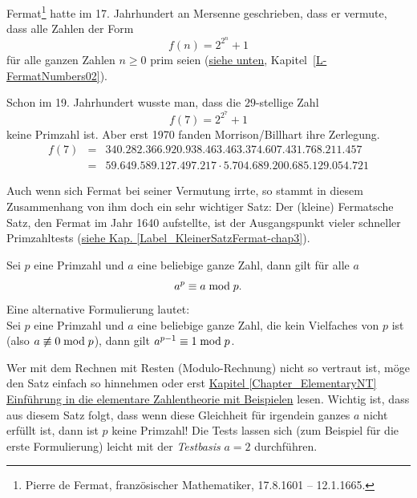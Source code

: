 \begin{refsegment}
\hypertarget{FermatNumbers01}{}\label{FermatNumbers01}%
Fermat\footnote{%
Pierre de Fermat, französischer Mathematiker, 17.8.1601 -- 12.1.1665.
}
 hatte im 17. Jahrhundert an Mersenne
 geschrieben, dass er vermute,
dass alle Zahlen der Form $$ f(n) = 2^{2^n} + 1 $$
für alle ganzen Zahlen $ n \geq 0 $ prim seien
(\hyperlink{FermatNumbers02}{siehe unten}, Kapitel~\ref{L-FermatNumbers02}).

Schon im 19. Jahrhundert wusste man, dass die $29$-stellige Zahl
$$ f(7) = 2^{2^7} + 1 $$
keine Primzahl ist. Aber erst 1970 fanden Morrison/Billhart ihre Zerlegung.
\label{F7Morrison}
\begin{eqnarray*}
f(7) & = & 340.282.366.920.938.463.463.374.607.431.768.211.457 \\
& = & 59. 649. 589. 127. 497. 217 \cdot  5.704.689.200.685.129.054.721
\end{eqnarray*}

Auch wenn sich Fermat bei seiner Vermutung irrte, so stammt in diesem
Zusammenhang von ihm doch ein sehr wichtiger Satz: Der (kleine)
Fermatsche Satz, den Fermat im Jahr 1640 aufstellte, ist der
Ausgangspunkt vieler schneller Primzahltests
(\hyperlink{KleinerSatzFermat-chap3}{siehe Kap.
\ref{Label_KleinerSatzFermat-chap3}}).

\hypertarget{KleinerSatzFermat-chap2}{}
\begin{satz}\label{thm-pz-fermat1}
Sei $p$ eine Primzahl und $a$ eine beliebige ganze Zahl, dann gilt für
alle $a$ $$a^p \equiv a \; {\rm mod} \; p.$$
Eine alternative Formulierung lautet: \\
Sei $p$ eine Primzahl und $a$ eine beliebige ganze Zahl, die kein
Vielfaches von $p$ ist (also $a \not\equiv 0 \; {\rm mod} \; p$),
dann gilt $a^{p-1} \equiv 1 \; {\rm mod} \; p$.
\end{satz}

Wer mit dem Rechnen mit Resten (Modulo-Rechnung) nicht so vertraut ist,
möge den Satz einfach so hinnehmen oder erst \hyperlink{Chapter_ElementaryNT}
{Kapitel \ref{Chapter_ElementaryNT} \glqq Einführung
in die elementare Zahlentheorie mit Beispielen\grqq} lesen.
Wichtig ist, dass aus diesem Satz folgt, dass wenn
diese Gleichheit für irgendein ganzes $a$ nicht erfüllt ist, dann ist
$p$ keine Primzahl! Die Tests lassen sich (zum Beispiel für die erste
Formulierung) leicht mit der {\em Testbasis} $a = 2$ durchführen.


\end{refsegment}
